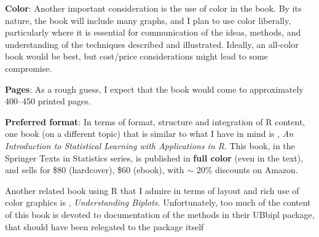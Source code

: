 \documentclass{article}
\newcommand{\VCDe}{\textsf{VCD}$^{2e}$\xspace}
\newcommand{\R}{\textsf{R}\xspace}
\newcommand{\pkg}[1]{{\normalfont\fontseries{b}\selectfont #1}}
\begin{document}
\textbf{Color}:
Another important consideration is the use of color in the book.  By its nature, the
book will include many graphs, and I plan to use color liberally, particularly where
it is essential for communication of the ideas, methods, and understanding of the
techniques described and illustrated.  Ideally, an all-color book would be best,
but cost/price considerations might lead to some compromise.

\textbf{Pages}:
As a rough guess, I expect that the book would come to approximately 400--450 printed pages.

\textbf{Preferred format}:
In terms of format, structure and integration of \R content, one book (on a different topic)
that is similar to what I have in mind is
\citet{James-etal:2013}, \emph{An Introduction to Statistical Learning with
Applications in R}. This book, in the Springer Texts in Statistics series,
is published in \textbf{full color} (even in the text), and sells for \$80 (hardcover), \$60 (ebook),
with $\sim$ 20\% discounts on Amazon.

Another related book using \R that
I admire in terms of layout and rich use of color graphics is
\citet{Gower-etal:2011}, \emph{Understanding Biplots}.
Unfortunately, too much of the content of this book is devoted to documentation of the
methods in their \pkg{UBbipl} package, that should have been relegated to the package
itself


%

%
%
\end{document}
